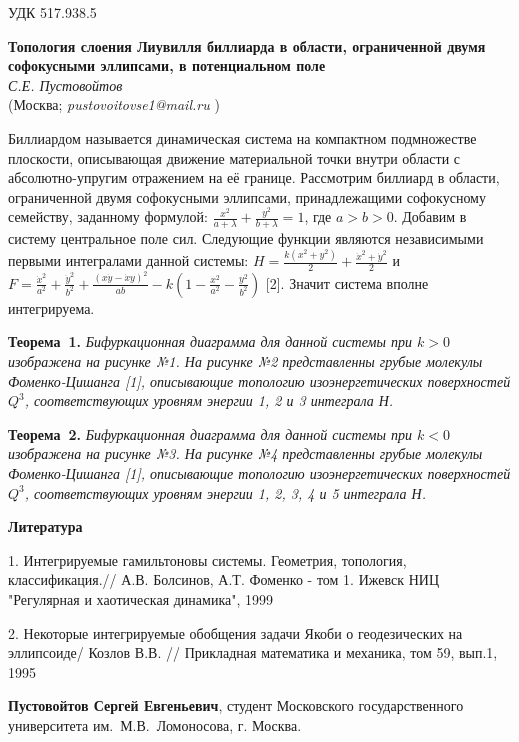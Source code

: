 \small УДК 517.938.5

\begin{center}{ \bf  Топология слоения Лиувилля биллиарда в области, ограниченной двумя софокусными эллипсами, в потенциальном поле}\\
{\it С.Е. Пустовойтов } \\
(Москва; {\it pustovoitovse1@mail.ru} )
\end{center}


Биллиардом называется динамическая система на компактном подмножестве плоскости, описывающая  движение материальной точки внутри области  с абсолютно-упругим отражением на её границе. Рассмотрим биллиард в области, ограниченной двумя софокусными эллипсами, принадлежащими софокусному семейству, заданному формулой: $\frac{x^2}{a+\lambda}+\frac{y
^2}{b+\lambda}=1$, где $a>b>0$. Добавим в систему центральное поле сил. Следующие функции являются независимыми первыми интегралами данной системы: $H=\frac{k(x^2+y^2)}{2}+\frac{\dot{x}^2+\dot{y}^2}{2}$ и $F=\frac{\dot{x}^2}{a^2}+\frac{\dot{y}^2}{b^2}+\frac{(x\dot{y}-\dot{x}y)^2}{ab}-k(1-\frac{x^2}{a^2}-\frac{y^2}{b^2})$ [2]. Значит система вполне интегрируема.

\textbf{Теорема~1.} {\it Бифуркационная диаграмма для данной системы при $k>0$ изображена на рисунке №1. На рисунке №2 представленны грубые молекулы Фоменко-Цишанга [1], описывающие топологию изоэнергетических поверхностей $Q^3$, соответствующих уровням энергии 1, 2 и 3 интеграла Н.
}

\textbf{Теорема~2.} {\it Бифуркационная диаграмма для данной системы при $k<0$ изображена на рисунке №3. На рисунке №4 представленны грубые молекулы Фоменко-Цишанга [1], описывающие топологию изоэнергетических поверхностей $Q^3$, соответствующих уровням энергии 1, 2, 3, 4 и 5 интеграла Н.
}

\smallskip \centerline{\bf Литература}\nopagebreak

1. Интегрируемые гамильтоновы системы. Геометрия, топология, классификация.// 	А.В. Болсинов, А.Т. Фоменко - том 1. Ижевск НИЦ	"Регулярная и хаотическая динамика", 1999

2. Некоторые интегрируемые обобщения задачи Якоби о геодезических на эллипсоиде/  Козлов В.В. // Прикладная математика и механика, том 59, вып.1, 1995

{\bf Пустовойтов Сергей Евгеньевич}, студент Московского государственного университета им.~М.В.~Ломоносова, г. Москва.

